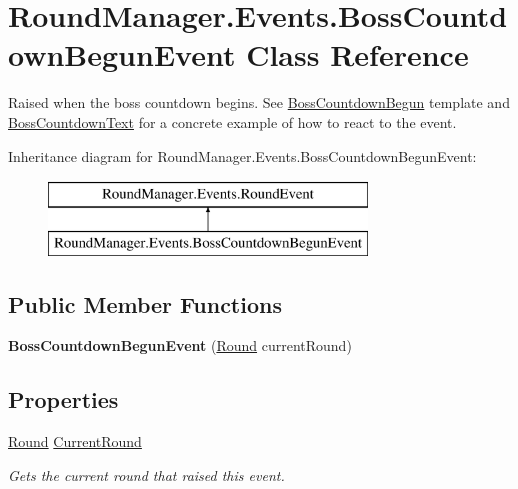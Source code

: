 \hypertarget{class_round_manager_1_1_events_1_1_boss_countdown_begun_event}{}\section{Round\+Manager.\+Events.\+Boss\+Countdown\+Begun\+Event Class Reference}
\label{class_round_manager_1_1_events_1_1_boss_countdown_begun_event}


Raised when the boss countdown begins. See \hyperlink{class_round_manager_1_1_boss_countdown_begun}{Boss\+Countdown\+Begun} template and \hyperlink{class_round_manager_1_1_boss_countdown_text}{Boss\+Countdown\+Text} for a concrete example of how to react to the event.  


Inheritance diagram for Round\+Manager.\+Events.\+Boss\+Countdown\+Begun\+Event\+:\begin{figure}[H]
\begin{center}
\leavevmode
\includegraphics[height=2.000000cm]{class_round_manager_1_1_events_1_1_boss_countdown_begun_event}
\end{center}
\end{figure}
\subsection*{Public Member Functions}
\begin{DoxyCompactItemize}
\item 
\hypertarget{class_round_manager_1_1_events_1_1_boss_countdown_begun_event_aa3f4c1d1f3b59180d5dec019c72ab4c3}{}{\bfseries Boss\+Countdown\+Begun\+Event} (\hyperlink{class_round_manager_1_1_round}{Round} current\+Round)\label{class_round_manager_1_1_events_1_1_boss_countdown_begun_event_aa3f4c1d1f3b59180d5dec019c72ab4c3}

\end{DoxyCompactItemize}
\subsection*{Properties}
\begin{DoxyCompactItemize}
\item 
\hyperlink{class_round_manager_1_1_round}{Round} \hyperlink{class_round_manager_1_1_events_1_1_boss_countdown_begun_event_ab222f79d5e16d452c0da7b5b8ba19a79}{Current\+Round}
\begin{DoxyCompactList}\small\item\em Gets the current round that raised this event. \end{DoxyCompactList}\end{DoxyCompactItemize}


